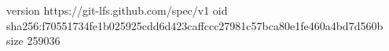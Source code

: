 version https://git-lfs.github.com/spec/v1
oid sha256:f70551734fe1b025925cdd6d423caffccc27981c57bca80e1fe460a4bd7d560b
size 259036
